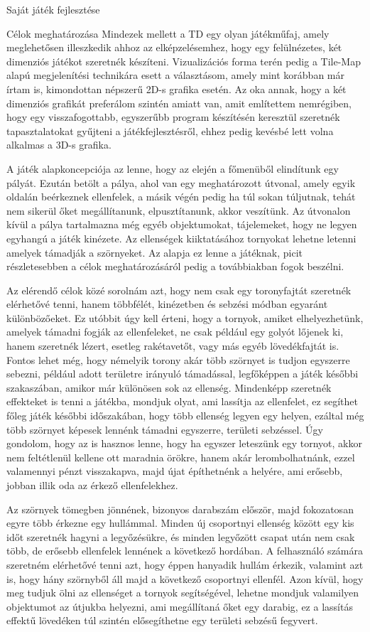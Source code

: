 \begin{MyChapter}{Saját játék fejlesztése}
\begin{MySection}{Célok meghatározása}
		Mindezek mellett a TD egy olyan játékműfaj, amely meglehetősen illeszkedik ahhoz az elképzelésemhez, hogy egy felülnézetes, két dimenziós játékot szeretnék készíteni. Vizualizációs forma terén pedig a Tile-Map alapú megjelenítési technikára esett a választásom, amely mint korábban már írtam is, kimondottan népszerű 2D-s grafika esetén. Az oka annak, hogy a két dimenziós grafikát preferálom szintén amiatt van, amit említettem nemrégiben, hogy egy visszafogottabb, egyszerűbb program készítésén keresztül szeretnék tapasztalatokat gyűjteni a játékfejlesztésről, ehhez pedig kevésbé lett volna alkalmas a 3D-s grafika.
		
		A játék alapkoncepciója az lenne, hogy az elején a főmenüből elindítunk egy pályát. Ezután betölt a pálya, ahol van egy meghatározott útvonal, amely egyik oldalán beérkeznek ellenfelek, a másik végén pedig ha túl sokan túljutnak, tehát nem sikerül őket megállítanunk, elpusztítanunk, akkor veszítünk. Az útvonalon kívül a pálya tartalmazna még egyéb objektumokat, tájelemeket, hogy ne legyen egyhangú a játék kinézete. Az ellenségek kiiktatásához tornyokat lehetne letenni amelyek támadják a szörnyeket. Az alapja ez lenne a játéknak, picit részletesebben a célok meghatározásáról pedig a továbbiakban fogok beszélni.
		
		Az elérendő célok közé sorolnám azt, hogy nem csak egy toronyfajtát szeretnék elérhetővé tenni, hanem többfélét, kinézetben és sebzési módban egyaránt különbözőeket. Ez utóbbit úgy kell érteni, hogy a tornyok, amiket elhelyezhetünk, amelyek támadni fogják az ellenfeleket, ne csak például egy golyót lőjenek ki, hanem szeretnék lézert, esetleg rakétavetőt, vagy más egyéb lövedékfajtát is. Fontos lehet még, hogy némelyik torony akár több szörnyet is tudjon egyszerre sebezni, például adott területre irányuló támadással, legfőképpen a játék későbbi szakaszában, amikor már különösen sok az ellenség. Mindenképp szeretnék effekteket is tenni a játékba, mondjuk olyat, ami lassítja az ellenfelet, ez segíthet főleg játék későbbi időszakában, hogy több ellenség legyen egy helyen, ezáltal még több szörnyet képesek lennénk támadni egyszerre, területi sebzéssel.
		Úgy gondolom, hogy az is hasznos lenne, hogy ha egyszer leteszünk egy tornyot, akkor nem feltétlenül kellene ott maradnia örökre, hanem akár lerombolhatnánk, ezzel valamennyi pénzt visszakapva, majd újat építhetnénk a helyére, ami erősebb, jobban illik oda az érkező ellenfelekhez. 
		
		Az szörnyek tömegben jönnének, bizonyos darabszám először, majd fokozatosan egyre több érkezne egy hullámmal. Minden új csoportnyi ellenség között egy kis időt szeretnék hagyni a legyőzésükre, és minden legyőzött csapat után nem csak több, de erősebb ellenfelek lennének a következő hordában. A felhasználó számára szeretném elérhetővé tenni azt, hogy éppen hanyadik hullám érkezik, valamint azt is, hogy hány szörnyből áll majd a következő csoportnyi ellenfél.
		Azon kívül, hogy meg tudjuk ölni az ellenséget a tornyok segítségével, lehetne mondjuk valamilyen objektumot az útjukba helyezni, ami megállítaná őket egy darabig, ez a lassítás effektű lövedéken túl szintén elősegíthetne egy területi sebzésű fegyvert.
		

\end{MySection}
\end{MyChapter}
